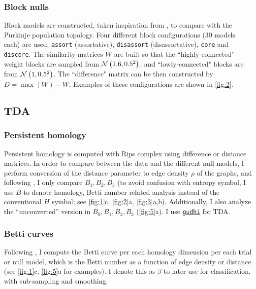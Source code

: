 \subsubsection*{Block nulls}

Block models are constructed, taken inspiration from \cite{Blevins2021-tf}, to compare with the Purkinje population topology. Four different block configurations (30 models each) are used: \texttt{assort} (assortative), \texttt{disassort} (disassortative), \texttt{core} and \texttt{discore}. The similarity matrices $W$ are built so that the ``highly-connected" weight blocks are sampled from $\mathcal{N}\left(1.6,0.5^2\right)$, and ``lowly-connected" blocks are from $\mathcal{N}\left(1,0.5^2\right)$. The ``difference" matrix can be then constructed by $D = \max(W) - W$. Examples of these configurations are shown in \autoref{fig:2}.

\subsection{TDA}

\subsubsection*{Persistent homology}

Persistent homology is computed with Rips complex using difference or distance matrices. In order to compare between the data and the different null models, I perform conversion of the distance parameter to edge density $\rho$ of the graphs, and following \cite{Giusti2015-uo}, I only compare $B_1,B_2,B_3$ (to avoid confusion with entropy symbol, I use $B$ to denote homology, Betti number related analysis instead of the conventional $H$ symbol; see \autoref{fig:1}c, \autoref{fig:2}a, \autoref{fig:3}a,b). Additionally, I also analyze the ``unconverted'' version in $B_0, B_1,B_2,B_3$ (\autoref{fig:5}a). I use \href{https://gudhi.inria.fr/}{\texttt{gudhi}} for TDA.

\subsubsection*{Betti curves}

Following \cite{Giusti2015-uo,Blevins2021-tf}, I compute the Betti curve per each homology dimension per each trial or null model, which is the Betti number as a function of edge density or distance (see \autoref{fig:1}c, \autoref{fig:5}a for examples). I denote this as $\beta$ to later use for classification, with sub-sampling and smoothing.

